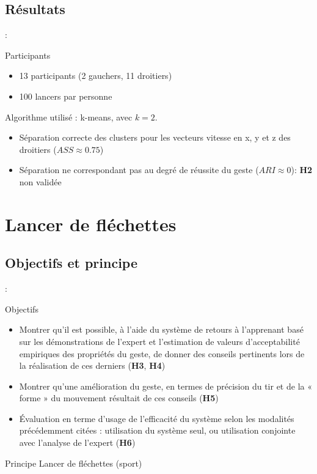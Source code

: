 \documentclass[svgnames]{beamer}
\begin{document}
	\subsection{Résultats}
	\begin{frame}{\secname : \subsecname}
		\begin{block}{Participants}
			\begin{itemize}[label=$\bullet$]
				\item 13 participants (2 gauchers, 11 droitiers)
				\item 100 lancers par personne
			\end{itemize}
		\end{block}

		Algorithme utilisé : k-means, avec $k=2$.
		\begin{itemize}
			\item Séparation correcte des clusters pour les vecteurs vitesse en x, y et z des droitiers ($ASS \approx 0.75$)
			\item Séparation ne correspondant pas au degré de réussite du geste ($ARI \approx 0$): \textbf{H2} non validée
		\end{itemize}
		
	\end{frame}

	\section{Lancer de fléchettes}
	\subsection{Objectifs et principe}
	\begin{frame}{\secname : \subsecname}
		\begin{block}{Objectifs}
			\begin{itemize}[label=$\bullet$]
				\item Montrer qu'il est possible, à l'aide du système de retours à l'apprenant basé sur les démonstrations de l'expert et l'estimation de valeurs d'acceptabilité empiriques des propriétés du geste, de donner des conseils pertinents lors de la réalisation de ces derniers (\textbf{H3}, \textbf{H4})
			 	\item Montrer qu'une amélioration du geste, en termes de précision du tir et de la « forme » du mouvement résultait de ces conseils (\textbf{H5})
			 	\item Évaluation en terme d'usage de l'efficacité du système selon les modalités précédemment citées : utilisation du système seul, ou utilisation conjointe avec l'analyse de l'expert (\textbf{H6})
			 \end{itemize}
		\end{block}
	
		\begin{block}{Principe}
			Lancer de fléchettes (sport)
		\end{block}
		
	\end{frame}
	
\end{document}
